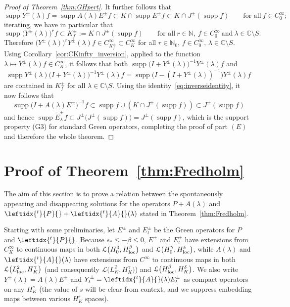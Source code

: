 \documentclass[pdftex]{sigma}
\numberwithin{equation}{section}
\newcommand{\CC}{{\mathbb C}}
\newcommand{\NN}{{\mathbb N}}
\newcommand{\LL}{{\mathcal L}}
\DeclareMathOperator{\supp}{supp}
\newcommand{\loc}{{\rm loc}}
\newcommand{\adj}[1]{\leftidx{^{t}}{#1}{}}
\begin{document}
\begin{proof}[Proof of Theorem~\ref{thm:GHpert}]
 	It further follows that
 	\begin{equation*}
 		\supp Y^\pm(\lambda) f =\supp A(\lambda)E^\pm f\subset K\cap \supp E^\pm f\subset K\cap J^\pm(\supp f)
 		\qquad \text{for all} \ f\in C_0^\infty;
 	\end{equation*}
iterating, we have in particular that
 	\begin{equation*}
 		\supp \big(Y^\pm(\lambda)\big)^r f\subset K^\pm_f:= K\cap J^\pm(\supp f) \qquad \text{for all} \ r\in \NN,\ f\in C_0^\infty \ \text{and} \ \lambda\in\CC\setminus S.
 	\end{equation*}	
 	Therefore $\big(Y^\pm(\lambda)\big)^r Y^\pm(\lambda) f\in C^\infty_{K^\pm_f}\subset C^\infty_K$ for all $r\in\NN_0$, $f\in C_0^\infty$, $\lambda\in \CC\setminus S$.
 	Using Corollary~\ref{cor:CKinfty_inversion}, applied to the function $\lambda\mapsto Y^\pm(\lambda) f\in C^\infty_K$, it follows that both
 	$\supp \big(I+Y^\pm(\lambda)\big)^{-1} Y^\pm(\lambda) f$ and
 	\begin{equation*}
 		\supp Y^\pm(\lambda) \big(I+Y^\pm(\lambda)\big)^{-1} Y^\pm(\lambda) f= \supp \big(I-(I+ Y^\pm(\lambda))^{-1}\big) Y^\pm(\lambda) f
 	\end{equation*}
 	are contained in $K^\pm_f$ for all $\lambda\in \CC\setminus S$. Using the identity~\eqref{eq:inverseidentity},
 	it now follows that
 	\begin{equation*}
 		\supp \big(I+ A(\lambda)E^\pm\big)^{-1} f \subset \supp f\cup \left(K\cap J^\pm(\supp f)\right) \subset
 		J^\pm(\supp f)
 	\end{equation*}
 	and hence $\supp \tilde{E}^\pm_\lambda f \subset J^\pm\big(J^\pm(\supp f)\big)=J^\pm(\supp f)$, which is the support property (G3) for standard Green operators, completing the proof of part $(E)$ and therefore the whole theorem.
 \end{proof}

 \section{Proof of Theorem~\ref{thm:Fredholm}}\label{sec:Fredholm}

 The aim of this section is to prove a relation between the spontaneously appearing and disappearing solutions for the operators $P+A(\lambda)$ and $\adj{P}+\adj{A}(\lambda)$ stated in Theorem~\ref{thm:Fredholm}.

 Starting with some preliminaries, let $E^\pm$ and $E_t^\pm$ be the
 Green operators for $P$ and $\adj{P}$.
 Because $s_*\le-\beta\le 0$, $E^\pm$ and $E_t^\pm$ have extensions from $C^\infty_K$ to continuous maps in both $\LL\big(H^0_0,H^\beta_\loc\big)$ and $\LL\big(H^\gamma_0,H^\delta_\loc\big)$, while $A(\lambda)$ and $\adj{A}(\lambda)$ have extensions from $C^\infty$ to continuous maps in both $\LL\big(L^2_\loc,H^\gamma_K\big)$ \big(and consequently $\LL\big(L^2_K,H^\gamma_K\big)$\big) and $\LL\big(H^\beta_\loc,H^\delta_K\big)$.
 We also write $Y^\pm(\lambda)=A(\lambda)E^\pm$ and $Y_t^\pm = \adj{A}(\lambda) E_t^\pm$
 as compact operators on any $H^s_K$ \big(the value of $s$ will be clear from context, and we suppress embedding maps between various $H^s_K$ spaces\big).
\end{document}
